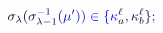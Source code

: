 \documentclass[12pt]{article}
\begin{document}
\makeatletter
\renewcommand*{\@textcolor}[3]{%
  \protect\leavevmode
  \begingroup
    \color#1{#2}#3%
  \endgroup
}
\makeatother
\begin{displaymath}
\mathcolor[RGB]{0,0,15}{\sigma} _ { \mathcolor[RGB]{0,0,30}{\lambda} } \mathcolor[RGB]{0,0,45}{(} \mathcolor[RGB]{0,0,60}{\sigma} _ { \mathcolor[RGB]{0,0,75}{\lambda} \mathcolor[RGB]{0,0,90}{-} \mathcolor[RGB]{0,0,105}{1} } ^ { \mathcolor[RGB]{0,0,120}{-} \mathcolor[RGB]{0,0,135}{1} } \mathcolor[RGB]{0,0,150}{(} \mathcolor[RGB]{0,0,165}{\mu} ^ { \mathcolor[RGB]{0,0,180}{\prime} } \mathcolor[RGB]{0,0,195}{)} \mathcolor[RGB]{0,0,210}{)} \mathcolor[RGB]{0,0,225}{\in} \mathcolor[RGB]{0,0,240}{\{} \mathcolor[RGB]{0,0,255}{\kappa} _ { \mathcolor[RGB]{0,15,0}{a} } ^ { \mathcolor[RGB]{0,15,15}{\ell} } \mathcolor[RGB]{0,15,30}{,} \mathcolor[RGB]{0,15,45}{\kappa} _ { \mathcolor[RGB]{0,15,60}{b} } ^ { \mathcolor[RGB]{0,15,75}{\ell} } \mathcolor[RGB]{0,15,90}{\}} \mathcolor[RGB]{0,15,105}{;}
\end{displaymath}
\end{document}
